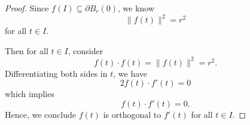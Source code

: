 \begin{Exercise}
\begin{proof}
Since $f(I) \subseteq \partial B_r(0)$, we know
$$
\| f(t) \|^2 = r^2
$$
for all $t\in I$.

Then for all $t\in I$, consider
$$
f(t)\cdot f(t) = \| f(t) \|^2 = r^2.
$$
Differentiating both sides in $t$, we have
$$
2 f(t)\cdot f'(t) = 0
$$
which implies
$$
f(t)\cdot f'(t) = 0.
$$
Hence, we conclude $f(t)$ is orthogonal to $f'(t)$ for all $t\in I$.
\end{proof}
\end{Exercise}